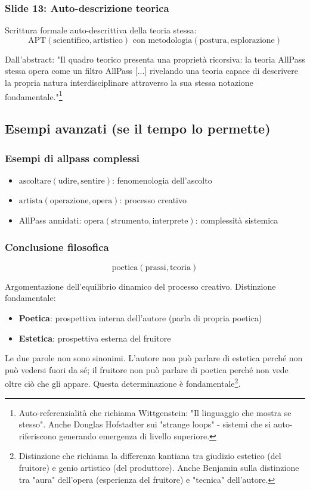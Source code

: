 \subsubsection{Slide 13: Auto-descrizione teorica}
Scrittura formale auto-descrittiva della teoria stessa:
$$\text{APT}(\text{scientifico},\text{artistico}) \text{ con } \text{metodologia}(\text{postura},\text{esplorazione})$$

Dall'abstract: "Il quadro teorico presenta una proprietà ricorsiva: la teoria AllPass stessa opera come un filtro AllPass [...] rivelando una teoria capace di descrivere la propria natura interdisciplinare attraverso la sua stessa notazione fondamentale."\footnote{Auto-referenzialità che richiama Wittgenstein: "Il linguaggio che mostra se stesso". Anche Douglas Hofstadter sui "strange loops" - sistemi che si auto-riferiscono generando emergenza di livello superiore.}

\subsection{Esempi avanzati (se il tempo lo permette)}

\subsubsection{Esempi di allpass complessi}
\begin{itemize}
\item $\text{ascoltare}(\text{udire},\text{sentire})$: fenomenologia dell'ascolto
\item $\text{artista}(\text{operazione},\text{opera})$: processo creativo
\item AllPass annidati: $\text{opera}(\text{strumento},\text{interprete})$: complessità sistemica
\end{itemize}

\subsubsection{Conclusione filosofica}
$$\text{poetica}(\text{prassi},\text{teoria})$$

Argomentazione dell'equilibrio dinamico del processo creativo.
Distinzione fondamentale:
\begin{itemize}
\item \textbf{Poetica}: prospettiva interna dell'autore (parla di propria poetica)
\item \textbf{Estetica}: prospettiva esterna del fruitore
\end{itemize}
Le due parole non sono sinonimi. L'autore non può parlare di estetica perché non può vedersi fuori da sé; il fruitore non può parlare di poetica perché non vede oltre ciò che gli appare. Questa determinazione è fondamentale\footnote{Distinzione che richiama la differenza kantiana tra giudizio estetico (del fruitore) e genio artistico (del produttore). Anche Benjamin sulla distinzione tra "aura" dell'opera (esperienza del fruitore) e "tecnica" dell'autore.}.

